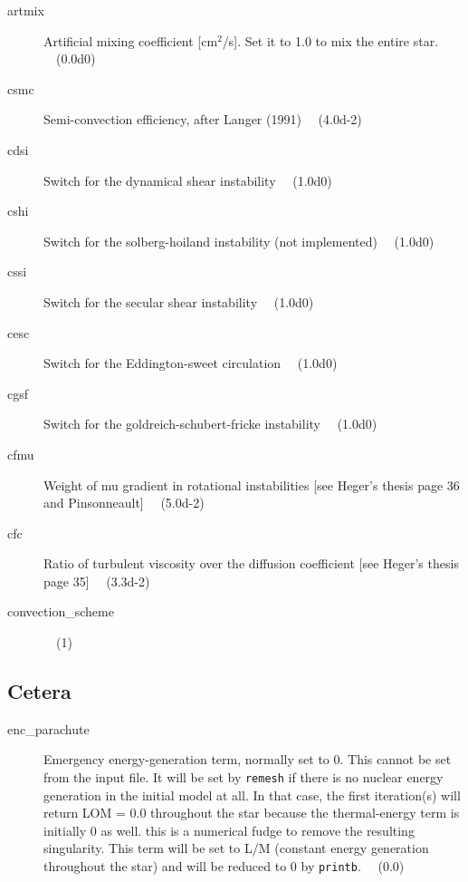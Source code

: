 \begin{description}
\item[artmix]\hypertarget{artmix}{} Artificial mixing coefficient [cm$^2$/s]. Set it to 1.0 to mix the entire star. \ \ (0.0d0)
\item[csmc]\hypertarget{csmc}{} Semi-convection efficiency, after Langer (1991) \ \ (4.0d-2)
\item[cdsi]\hypertarget{cdsi}{} Switch for the dynamical shear instability \ \ (1.0d0)
\item[cshi]\hypertarget{cshi}{} Switch for the solberg-hoiland instability (not implemented) \ \ (1.0d0)
\item[cssi]\hypertarget{cssi}{} Switch for the secular shear instability \ \ (1.0d0)
\item[cesc]\hypertarget{cesc}{} Switch for the Eddington-sweet circulation \ \ (1.0d0)
\item[cgsf]\hypertarget{cgsf}{} Switch for the goldreich-schubert-fricke instability \ \ (1.0d0)
\item[cfmu]\hypertarget{cfmu}{} Weight of mu gradient in rotational instabilities [see Heger's thesis page 36 and Pinsonneault] \ \ (5.0d-2)
\item[cfc]\hypertarget{cfc}{} Ratio of turbulent viscosity over the diffusion coefficient [see Heger's thesis page 35] \ \ (3.3d-2)
\item[convection\_scheme]\hypertarget{convection_scheme}{}   \ \ (1)
\end{description}





\subsection{Cetera}
\label{sec:initdat:cetera}

\begin{description}
\item[enc\_parachute]\hypertarget{enc_parachute}{}
  Emergency energy-generation term, normally set to 0. This cannot be set from the input file. It will be set by \texttt{remesh} if there is no nuclear energy generation in the initial model at all. 
  In that case, the first iteration(s) will return LOM = 0.0 throughout the star because the thermal-energy term is initially 0 as well. this is a numerical fudge to remove the resulting singularity. 
  This term will be set to L/M (constant energy generation throughout the star) and will be reduced to 0 by \texttt{printb}.  \ \ (0.0)
\end{description}


